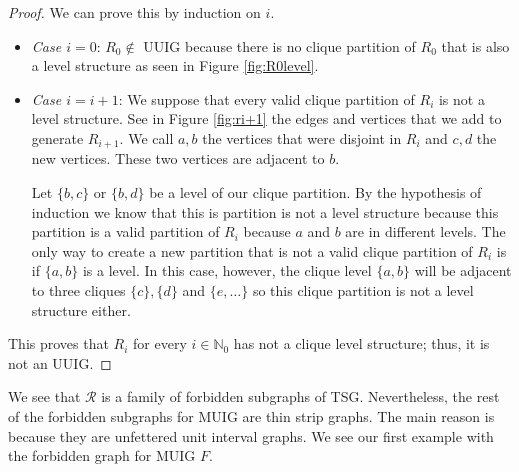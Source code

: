 \begin{proof}
  We can prove this by induction on $i$.

  \begin{itemize}
    \item \emph{Case $i=0$}: $R_0 \notin$ UUIG because there is no clique partition of $R_0$ that is also a level structure as seen in Figure \ref{fig:R0level}.
    \item \emph{Case $i = i+1$}: We suppose that every valid clique partition of $R_i$ is not a level structure. See in Figure \ref{fig:ri+1} the edges and vertices that we add to generate $R_{i+1}$. We call $a,b$ the vertices that were disjoint in $R_i$ and $c,d$ the new vertices. These two vertices are adjacent to $b$.

    Let $\{b,c\}$ or $\{b,d\}$ be a level of our clique partition. By the hypothesis of induction we know that this is partition is not a level structure because this partition is a valid partition of $R_i$ because $a$ and $b$ are in different levels. The only way to create a new partition that is not a valid clique partition of $R_i$ is if $\{a,b\}$ is a level. In this case, however, the clique level $\{a,b\}$ will be adjacent to three cliques $\{c\}, \{d\}$ and $\{e, \dots\}$ so this clique partition is not a level structure either.
  \end{itemize}

  This proves that $R_i$ for every $i \in \mathbb{N}_0$ has not a clique level structure; thus, it is not an UUIG.
\end{proof}

We see that $\mathcal{R}$ is a family of forbidden subgraphs of TSG. Nevertheless, the rest of the forbidden subgraphs for MUIG are thin strip graphs. The main reason is because they are unfettered unit interval graphs. We see our first example with the forbidden graph for MUIG $F$.

